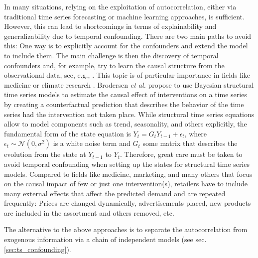 \documentclass[BCOR=1mm, DIV=calc,10pt,
twoside=true,
twocolumn,
headings=normal]{scrartcl}
\newcommand{\etal}{ {\em et al.}}
\begin{document}
In many situations, relying on the exploitation of autocorrelation, either via traditional time series forecasting or machine learning approaches, is sufficient. However, this can lead to shortcomings in terms of explainability and generalizability due to temporal confounding. There are two main paths to avoid this: One way is to explicitly account for the confounders and extend the model to include them. The main challenge is then the discovery of temporal confounders and, for example, try to learn the causal structure from the observational data, see, e.g., \cite{malinsky2018causal,runge2018causal,Runge2019}. This topic is of particular importance in fields like medicine \cite{bica2020time} or climate research \cite{perrakis2014controlling}. Brodersen \etal \cite{Brodersen2015,GoogleCausalImpact} propose to use Bayesian structural time series models to estimate the causal effect of interventions on a time series by creating a counterfactual prediction that describes the behavior of the time series had the intervention not taken place. While structural time series equations allow to model components such as trend, seasonality, and others explicitly, the fundamental form of the state equation is $Y_t = G_t Y_{t-1} + \epsilon_t$, where $\epsilon_t \sim \mathcal{N}(0,\sigma^2)$ is a white noise term and $G_t$ some matrix that describes the evolution from the state at $Y_{t-1}$ to $Y_t$. Therefore, great care must be taken to avoid temporal confounding when setting up the states for structural time series models. Compared to fields like medicine, marketing, and many others that focus on the causal impact of few or just one intervention(s), retailers have to include many external effects that affect the predicted demand and are repeated frequently: Prices are changed dynamically, advertisements placed, new products are included in the assortment and others removed, etc.

\noindent
The alternative to the above approaches is to separate the autocorrelation from exogenous information via a chain of independent models (see sec. \ref{sec:ts_confounding}). 
\end{document}
